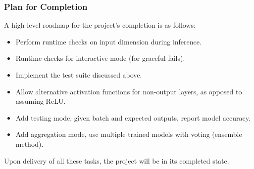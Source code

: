 \documentclass{beamer}
\begin{document}
\begin{frame}
  \frametitle{Plan for Completion}

  A high-level roadmap for the project's completion is as follows:
  \begin{itemize}
    \item Perform runtime checks on input dimension during inference.
    \item Runtime checks for interactive mode (for graceful fails).
    \item Implement the test suite discussed above.
    \item Allow alternative activation functions for non-output layers, as opposed to assuming ReLU.
    \item Add testing mode, given batch and expected outputs, report model accuracy.
    \item Add aggregation mode, use multiple trained models with voting (ensemble method).
  \end{itemize}
  Upon delivery of all these tasks, the project will be in its completed state.

\end{frame}
\end{document}
